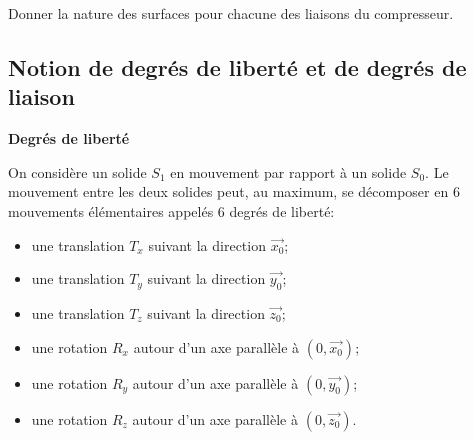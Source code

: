 \documentclass[10pt,oneside]{article}
\begin{document}
\begin{exemple}
Donner la nature des surfaces pour chacune des liaisons du compresseur. 

\end{exemple}



\subsection{Notion de degrés de liberté et de degrés de liaison}
\begin{defi}
\textbf{Degrés de liberté}

On considère un solide $S_1$ en mouvement par rapport à un solide $S_0$. Le mouvement entre les deux solides peut, au maximum, se décomposer en 6 mouvements élémentaires appelés 6 degrés de liberté:

\vspace{.25cm}

\begin{minipage}[c]{.44\linewidth}
\begin{itemize}
\item une translation $T_x$ suivant la direction $\overrightarrow{x_0}$;
\item une translation $T_y$ suivant la direction $\overrightarrow{y_0}$;
\item une translation $T_z$ suivant la direction $\overrightarrow{z_0}$;
\end{itemize}
\end{minipage} \hfill
\begin{minipage}[c]{.55\linewidth}
\begin{itemize}
\item une rotation $R_x$ autour d'un axe parallèle à $\left(0,\overrightarrow{x_0}\right)$;
\item une rotation $R_y$ autour d'un axe parallèle à $\left(0,\overrightarrow{y_0}\right)$;
\item une rotation $R_z$ autour d'un axe parallèle à $\left(0,\overrightarrow{z_0}\right)$.
\end{itemize}
\end{minipage}
\end{defi}
\end{document}
